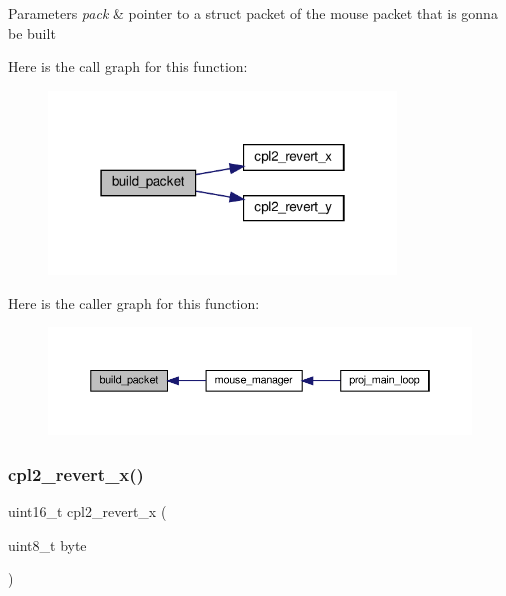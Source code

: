\begin{DoxyParams}{Parameters}
{\em pack} & pointer to a struct packet of the mouse packet that is gonna be built \\
\hline
\end{DoxyParams}
Here is the call graph for this function\+:\nopagebreak
\begin{figure}[H]
\begin{center}
\leavevmode
\includegraphics[width=262pt]{group__mouse_ga7d38d68c1222c116e819346c1c3d36f1_cgraph}
\end{center}
\end{figure}
Here is the caller graph for this function\+:
\nopagebreak
\begin{figure}[H]
\begin{center}
\leavevmode
\includegraphics[width=350pt]{group__mouse_ga7d38d68c1222c116e819346c1c3d36f1_icgraph}
\end{center}
\end{figure}
\mbox{\label{group__mouse_gaca472150bedc1bf9e0008ffd9929b165}} 
\subsubsection{\texorpdfstring{cpl2\+\_\+revert\+\_\+x()}{cpl2\_revert\_x()}}
{\footnotesize\ttfamily uint16\+\_\+t cpl2\+\_\+revert\+\_\+x (\begin{DoxyParamCaption}\item[{uint8\+\_\+t}]{byte }\end{DoxyParamCaption})}



